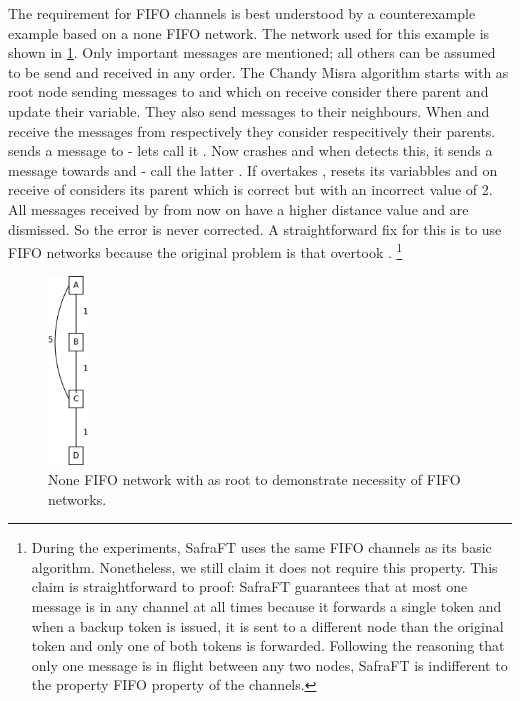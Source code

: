 The requirement for FIFO channels is best understood by a counterexample example based on a none FIFO network.
The network used for this example is shown in \cref{fig:fifoNecessaryNetwork}. 
Only important messages are mentioned; all others can be assumed to be send and received in any order.
The Chandy Misra algorithm starts with  as root node sending  messages to  and  which on receive consider  there parent and update their  variable.
They also send  messages to their neighbours. 
When  and  receive the  messages from  respectively  they consider  respecitively  their parents.
 sends a  message to  - lets call it .
Now  crashes and when  detects this, it sends a  message towards  and  - call the latter .
If  overtakes ,  resets its variabbles and on receive of  considers  its parent which is correct but with an incorrect  value of 2.
All  messages received by  from now on have a higher distance value and are dismissed. 
So the error is never corrected.
A straightforward fix for this is to use FIFO networks because the original problem is that  overtook .
\footnote{During the experiments, SafraFT uses the same FIFO channels as its basic algorithm.
Nonetheless, we still claim it does not require this property.
This claim is straightforward to proof: SafraFT guarantees that at most one message is in any channel at all times because it forwards a single token and when a backup token is issued, it is sent to a different node than the original token and only one of both tokens is forwarded.
Following the reasoning that only one message is in flight between any two nodes, SafraFT is indifferent to the property FIFO property of the channels.}

\begin{figure}[h]
	\includegraphics[height=5cm]{figures/FIFO_necessary}
	\centering
	\caption{None FIFO network with  as root to demonstrate necessity of FIFO networks.}    
	\label{fig:fifoNecessaryNetwork}
\end{figure}


